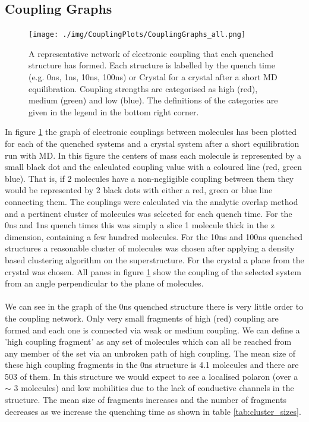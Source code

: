 \subsection{Coupling Graphs}
\label{sect:couplGraphs}
\begin{figure}[ht]
	\texttt{[image: ./img/CouplingPlots/CouplingGraphs\_all.png]}
	\caption{\label{fig:crystalCouplingGraph}A representative network of electronic coupling that each quenched structure has formed. Each structure is labelled by the quench time (e.g. 0ns, 1ns, 10ns, 100ns) or Crystal for a crystal after a short MD equilibration. Coupling strengths are categorised as high (red), medium (green) and low (blue). The definitions of the categories are given in the legend in the bottom right corner.}
\end{figure}
\noindent In figure \ref{fig:crystalCouplingGraph} the graph of electronic couplings between molecules has been plotted for each of the quenched systems and a crystal system after a short equilibration run with MD. In this figure the centers of mass each molecule is represented by a small black dot and the calculated coupling value with a coloured line (red, green blue). That is, if 2 molecules have a non-negligible coupling between them they would be represented by 2 black dots with either a red, green or blue line connecting them. The couplings were calculated via the analytic overlap method \cite{gajdos_ultrafast_2014} and a pertinent cluster of molecules was selected for each quench time. For the 0ns and 1ns quench times this was simply a slice 1 molecule thick in the z dimension, containing a few hundred molecules. For the 10ns and 100ns quenched structures a reasonable cluster of molecules was chosen after applying a density based clustering algorithm on the superstructure. For the crystal a plane from the crystal was chosen. All panes in figure \ref{fig:crystalCouplingGraph} show the coupling of the selected system from an angle perpendicular to the plane of molecules.
\\\\
We can see in the graph of the 0ns quenched structure there is very little order to the coupling network. Only very small fragments of high (red) coupling are formed and each one is connected via weak or medium coupling. We can define a 'high coupling fragment' as any set of molecules which can all be reached from any member of the set via an unbroken path of high coupling. The mean size of these high coupling fragments in the 0ns structure is 4.1 molecules and there are 503 of them. In this structure we would expect to see a localised polaron (over a $\sim$ 3 molecules) and low mobilities due to the lack of conductive channels in the structure. The mean size of fragments increases and the number of fragments decreases as we increase the quenching time as shown in table \ref{tab:cluster_sizes}.
